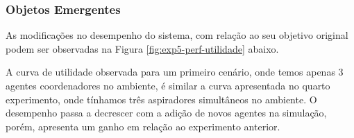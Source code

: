 \subsubsection{Objetos Emergentes}

As modificações no desempenho do sistema, com relação ao seu objetivo original podem ser observadas na Figura \ref{fig:exp5-perf-utilidade} abaixo.

\begin{figure}[h!]
    \centering
\end{figure}

A curva de utilidade observada para um primeiro cenário, onde temos apenas 3 agentes coordenadores no ambiente, é similar a curva apresentada no quarto experimento, onde tínhamos três aspiradores simultâneos no ambiente.  O desempenho passa a decrescer com a adição de novos agentes na simulação, porém, apresenta um ganho em relação ao experimento anterior.


\begin{figure}[h!]
    \centering
\end{figure}

